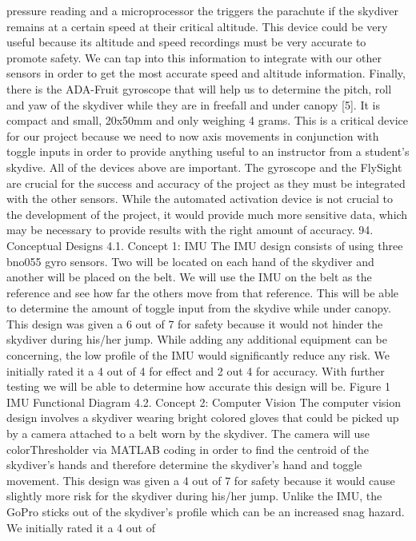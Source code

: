 pressure reading and a microprocessor the triggers the parachute if the skydiver remains at a certain speed at their
critical altitude. This device could be very useful because its altitude and speed recordings must be very accurate to
promote safety. We can tap into this information to integrate with our other sensors in order to get the most accurate
speed and altitude information.
Finally, there is the ADA-Fruit gyroscope that will help us to determine the pitch, roll and yaw of the skydiver while they
are in freefall and under canopy [5]. It is compact and small, 20x50mm and only weighing 4 grams. This is a critical device
for our project because we need to now axis movements in conjunction with toggle inputs in order to provide anything
useful to an instructor from a student’s skydive.
All of the devices above are important. The gyroscope and the FlySight are crucial for the success and accuracy of the
project as they must be integrated with the other sensors. While the automated activation device is not crucial to the
development of the project, it would provide much more sensitive data, which may be necessary to provide results with
the right amount of accuracy.
94.
Conceptual Designs
4.1.
Concept 1: IMU
The IMU design consists of using three bno055 gyro sensors. Two will be located on each hand of the skydiver and
another will be placed on the belt. We will use the IMU on the belt as the reference and see how far the others move
from that reference. This will be able to determine the amount of toggle input from the skydive while under canopy. This
design was given a 6 out of 7 for safety because it would not hinder the skydiver during his/her jump. While adding any
additional equipment can be concerning, the low profile of the IMU would significantly reduce any risk. We initially rated
it a 4 out of 4 for effect and 2 out 4 for accuracy. With further testing we will be able to determine how accurate this
design will be.
Figure 1 IMU Functional Diagram
4.2.
Concept 2: Computer Vision
The computer vision design involves a skydiver wearing bright colored gloves that could be picked up by a camera
attached to a belt worn by the skydiver. The camera will use colorThresholder via MATLAB coding in order to find the
centroid of the skydiver’s hands and therefore determine the skydiver’s hand and toggle movement. This design was
given a 4 out of 7 for safety because it would cause slightly more risk for the skydiver during his/her jump. Unlike the
IMU, the GoPro sticks out of the skydiver’s profile which can be an increased snag hazard. We initially rated it a 4 out of
